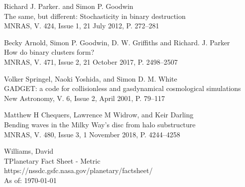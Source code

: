 \documentclass[a4paper,10pt]{article}
\begin{document}
\begin{thebibliography}{9}
Richard J. Parker. and Simon P. Goodwin\\
The same, but different: Stochasticity in binary destruction\\
MNRAS, V. 424, Issue 1, 21 July 2012, P. 272--281

Becky Arnold, Simon P. Goodwin, D. W. Griffiths and Richard. J. Parker\\
How do binary clusters form?\\
MNRAS, V. 471, Issue 2, 21 October 2017, P. 2498--2507

Volker Springel, Naoki Yoshida, and Simon D. M. White\\
GADGET: a code for collisionless and gasdynamical cosmological simulations\\
New Astronomy, V. 6, Issue 2, April 2001, P. 79--117

Matthew H Chequers, Lawrence M Widrow, and Keir Darling\\
Bending waves in the Milky Way's disc from halo substructure\\
MNRAS, V. 480, Issue 3, 1 November 2018, P. 4244--4258

Williams, David\\
TPlanetary Fact Sheet - Metric\\
https://nssdc.gsfc.nasa.gov/planetary/factsheet/\\ As of: \today

\end{thebibliography}

\pagebreak[4]
\end{document}
